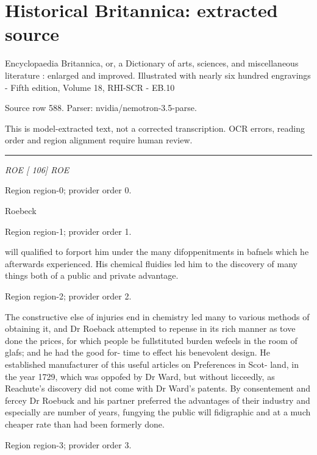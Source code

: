\documentclass[11pt]{article}
\begin{document}
\section*{Historical Britannica: extracted source}
Encyclopaedia Britannica, or, a Dictionary of arts, sciences, and miscellaneous literature : enlarged and improved. Illustrated with nearly six hundred engravings - Fifth edition, Volume 18, RHI-SCR - EB.10\par
{\small Source row 588. Parser: nvidia/nemotron-3.5-parse.\par}
{\small This is model-extracted text, not a corrected transcription. OCR errors, reading order and region alignment require human review.\par}
\hrule\medskip
{\small\itshape ROE [ 106] ROE\par}

{\scriptsize\color{gray} Region region-0; provider order 0.\par}
\medskip

Roebeck
\par

{\scriptsize\color{gray} Region region-1; provider order 1.\par}
\medskip

will qualified to forport him under the many difoppenitments in bafnels which he afterwards experienced. His chemical fluidies led him to the discovery of many things both of a public and private advantage.
\par

{\scriptsize\color{gray} Region region-2; provider order 2.\par}
\medskip

The constructive else of injuries end in chemistry led many to various methods of obtaining it, and Dr Roeback attempted to repense in its rich manner as tove done the prices, for which people be fullstituted burden wefeels in the room of glafs; and he had the good for- time to effect his benevolent design. He established manufacturer of this useful articles on Preferences in Scot- land, in the year 1729, which was oppofed by Dr Ward, but without licceedly, as Reachute’s discovery did not come with Dr Ward's patents. By consentement and fercey Dr Roebuck and his partner preferred the advantages of their industry and especially are number of years, fungying the public will fidigraphic and at a much cheaper rate than had been formerly done.
\par

{\scriptsize\color{gray} Region region-3; provider order 3.\par}
\medskip
\end{document}
